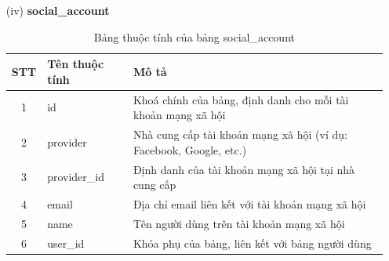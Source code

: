 \documentclass[../DoAn.tex]{subfiles}
\begin{document}
\begin{enumerate}
    \item[(iv)] \textbf{social\_account}
    \begin{table}[H]
    \centering
        \begin{tabular}{|c|m{4cm}|m{8cm}|}
        \hline
        \textbf{STT} & \textbf{Tên thuộc tính} & \textbf{Mô tả} \\
        \hline
        1 & id & Khoá chính của bảng, định danh cho mỗi tài khoản mạng xã hội \\
        \hline
        2 & provider & Nhà cung cấp tài khoản mạng xã hội (ví dụ: Facebook, Google, etc.) \\
        \hline
        3 & provider\_id & Định danh của tài khoản mạng xã hội tại nhà cung cấp \\
        \hline
        4 & email & Địa chỉ email liên kết với tài khoản mạng xã hội \\
        \hline
        5 & name & Tên người dùng trên tài khoản mạng xã hội \\
        \hline
        6 & user\_id & Khóa phụ của bảng, liên kết với bảng người dùng \\
        \hline
        \end{tabular}
        \caption{Bảng thuộc tính của bảng social\_account}
        \label{tab:social_account_attributes}
    \end{table}


\end{enumerate}
\end{document}
